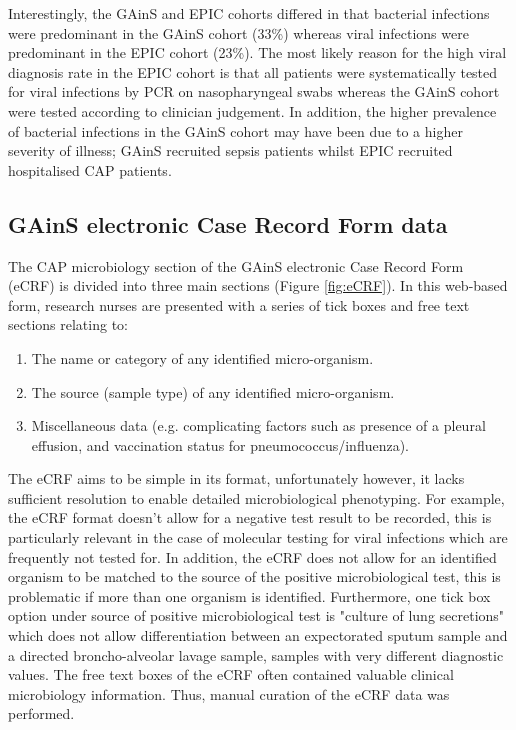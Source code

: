 Interestingly, the GAinS and EPIC cohorts differed in that bacterial infections were predominant in the GAinS cohort (33\%) whereas viral infections were predominant in the EPIC cohort (23\%). The most likely reason for the high viral diagnosis rate in the EPIC cohort is that all patients were systematically tested for viral infections by PCR on nasopharyngeal swabs whereas the GAinS cohort were tested according to clinician judgement. In addition, the higher prevalence of bacterial infections in the GAinS cohort may have been due to a higher severity of illness; GAinS recruited sepsis patients whilst EPIC recruited hospitalised CAP patients.

\subsection{GAinS electronic Case Record Form data}
The CAP microbiology section of the GAinS electronic Case Record Form (eCRF) is divided into three main sections (Figure \ref{fig:eCRF}). In this web-based form, research nurses are presented with a series of tick boxes and free text sections relating to:
\begin{enumerate}
	\item The name or category of any identified micro-organism.
	\item The source (sample type) of any identified micro-organism.
	\item Miscellaneous data (e.g. complicating factors such as presence of a pleural effusion, and vaccination status for pneumococcus/influenza).
\end{enumerate}

The eCRF aims to be simple in its format, unfortunately however, it lacks sufficient resolution to enable detailed microbiological phenotyping. For example, the eCRF format doesn't allow for a negative test result to be recorded, this is particularly relevant in the case of molecular testing for viral infections which are frequently not tested for. In addition, the eCRF does not allow for an identified organism to be matched to the source of the positive microbiological test, this is problematic if more than one organism is identified. Furthermore, one tick box option under source of positive microbiological test is "culture of lung secretions" which does not allow differentiation between an expectorated sputum sample and a directed broncho-alveolar lavage sample, samples with very different diagnostic values. The free text boxes of the eCRF often contained valuable clinical microbiology information. Thus, manual curation of the eCRF data was performed.

